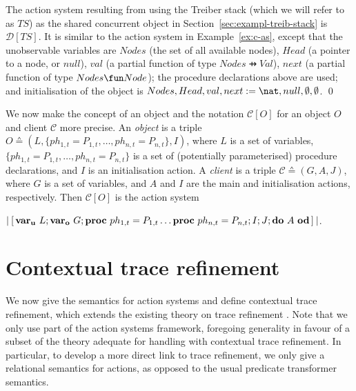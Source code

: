\documentclass[11pt]{llncs}
\def \proc{{\bf proc}\ }
\def \lact{\mathop{|\joinrel\![}}
\def \ract{\mathop{]\joinrel\!|}}
\def \endbox{\hfill \qed}
\def \asgn  {{\;:=\;}}
\def \lvar {{\bf var_u}\ }
\def \gvar {{\bf var_o}\ }
\newcommand{\ddo}{\mathbf{do}}
\newcommand{\ood}{\mathbf{od}}
\newcommand{\mcC}{\mathcal{C}}
\newcommand{\mcD}{\mathcal{D}}
\newcommand{\refsec}[1]{Section~\ref{#1}}
\newcommand{\refex}[1]{Example~\ref{#1}}
\begin{document}
\begin{example}
  \noindent The action system resulting from using the Treiber stack
  (which we will refer to as $TS$) as the shared concurrent object in
  \refsec{sec:exampl-treib-stack} is $\mcD[TS]$. It is similar to the
  action system in \refex{ex:c-as}, except that the unobservable
  variables are $Nodes$ (the set of all available nodes), $Head$ (a
  pointer to a node, or $null$), $val$ (a partial function of type
  $Nodes \pfun Val$), $next$ (a partial function of type
  $Nodes \fun Node$); the procedure declarations above are used; and
  initialisation of the object is
  $Nodes, Head, val, next \asgn \nat, null, \emptyset, \emptyset$.
  \endbox
\end{example}

We now make the concept of an object and the notation $\mcC[O]$ for an
object $O$ and client $\mcC$ more precise. An \emph{object} is a
triple
$O \sdef (L, \{ph_{1,t} = P_{1,t}, \dots, ph_{n,t} = P_{n,t}\}, I)$,
where $L$ is a set of variables,
$\{ph_{1,t} = P_{1,t}, \dots, ph_{n,t} = P_{n,t}\}$ is a set of
(potentially parameterised) procedure declarations, and $I$ is an
initialisation action. A \emph{client} is a triple
$\mcC \sdef (G, A, J)$, where $G$ is a set of variables, and $A$ and
$I$ are the main and initialisation actions, respectively. Then
$\mcC[O]$ is the action system\smallskip

\hfill $ \lact \lvar L ; \gvar G ; \proc ph_{1,t} = P_{1,t} \dots
\proc ph_{n,t} = P_{n,t}; I ; J ;
\ddo\ A\ \ood \ract $.\hfill{}
\vspace{-2mm}

\section{Contextual trace refinement}
\label{sec:modell-client-object}

We now give the semantics for action systems and define contextual
trace refinement, which extends the existing theory on trace
refinement \cite{back94trace}. Note that we only use part of the
action systems framework, foregoing generality in favour of a subset
of the theory adequate for handling with contextual trace
refinement. In particular, to develop a more direct link to trace
refinement, we only give a relational semantics for actions, as
opposed to the usual predicate transformer semantics.
\end{document}
